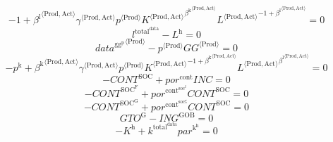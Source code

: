 \begin{equation}
-1 + {{\beta^{\mathrm{l}}}^{\langle \mathrm{\mathrm{Prod}},\mathrm{\mathrm{Act}}\rangle}} {{\gamma}^{\langle \mathrm{\mathrm{Prod}},\mathrm{\mathrm{Act}}\rangle}} {{p}^{\langle \mathrm{Prod}\rangle}} {{{K}^{\langle \mathrm{Prod},\mathrm{Act}\rangle}}^{{\beta^{\mathrm{k}}}^{\langle \mathrm{\mathrm{Prod}},\mathrm{\mathrm{Act}}\rangle}}} {{{L}^{\langle \mathrm{Prod},\mathrm{Act}\rangle}}^{-1 + {\beta^{\mathrm{l}}}^{\langle \mathrm{\mathrm{Prod}},\mathrm{\mathrm{Act}}\rangle}}} = 0
\end{equation}
\begin{equation}
l^{\mathrm{total}^{\mathrm{data}}} - L^{\mathrm{h}} = 0
\end{equation}
\begin{equation}
{{d\!a\!t\!a}^{\mathrm{gg}^{\mathrm{p}}}}^{\langle \mathrm{\mathrm{Prod}}\rangle} - {{p}^{\langle \mathrm{Prod}\rangle}} {{{G\!G}}^{\langle \mathrm{Prod}\rangle}} = 0
\end{equation}
\begin{equation}
-p^{\mathrm{k}} + {{\beta^{\mathrm{k}}}^{\langle \mathrm{\mathrm{Prod}},\mathrm{\mathrm{Act}}\rangle}} {{\gamma}^{\langle \mathrm{\mathrm{Prod}},\mathrm{\mathrm{Act}}\rangle}} {{p}^{\langle \mathrm{Prod}\rangle}} {{{K}^{\langle \mathrm{Prod},\mathrm{Act}\rangle}}^{-1 + {\beta^{\mathrm{k}}}^{\langle \mathrm{\mathrm{Prod}},\mathrm{\mathrm{Act}}\rangle}}} {{{L}^{\langle \mathrm{Prod},\mathrm{Act}\rangle}}^{{\beta^{\mathrm{l}}}^{\langle \mathrm{\mathrm{Prod}},\mathrm{\mathrm{Act}}\rangle}}} = 0
\end{equation}
\begin{equation}
-{C\!O\!N\!T}^{\mathrm{SOC}} + {{p\!o\!r}^{\mathrm{cont}}} {{I\!N\!C}} = 0
\end{equation}
\begin{equation}
-{C\!O\!N\!T}^{\mathrm{SOC}^{\mathrm{F}}} + {{p\!o\!r}^{\mathrm{cont}^{\mathrm{soc}^{\mathrm{f}}}}} {{C\!O\!N\!T}^{\mathrm{SOC}}} = 0
\end{equation}
\begin{equation}
-{C\!O\!N\!T}^{\mathrm{SOC}^{\mathrm{G}}} + {{p\!o\!r}^{\mathrm{cont}^{\mathrm{soc}^{\mathrm{g}}}}} {{C\!O\!N\!T}^{\mathrm{SOC}}} = 0
\end{equation}
\begin{equation}
{G\!T\!O}^{\mathrm{G}} - {I\!N\!G}^{\mathrm{GOB}} = 0
\end{equation}
\begin{equation}
-K^{\mathrm{h}} + {k^{\mathrm{total}^{\mathrm{data}}}} {{p\!a\!r}^{\mathrm{k}^{\mathrm{h}}}} = 0
\end{equation}
